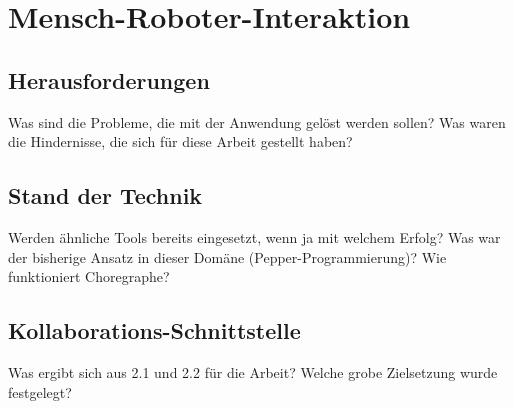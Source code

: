\chapter{Mensch-Roboter-Interaktion} %

\section{Herausforderungen} %
Was sind die Probleme, die mit der Anwendung gelöst werden sollen? Was waren die Hindernisse, die sich für diese Arbeit gestellt haben? 

\section{Stand der Technik}\label{sec:stand-der-technik} %
Werden ähnliche Tools bereits eingesetzt, wenn ja mit welchem Erfolg? Was war der bisherige Ansatz in dieser Domäne (Pepper-Programmierung)? Wie funktioniert Choregraphe?

\section{Kollaborations-Schnittstelle} \label{sec:2.3-kollab} %
Was ergibt sich aus 2.1 und 2.2 für die Arbeit? Welche grobe Zielsetzung wurde festgelegt?




